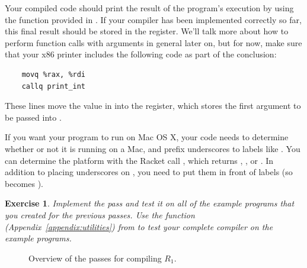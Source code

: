 \documentclass[11pt]{book}
\newtheorem{exercise}[theorem]{Exercise}
\begin{document}
Your compiled code should print the result of the program's execution
by using the  function provided in
. If your compiler has been implemented correctly so
far, this final result should be stored in the  register.
We'll talk more about how to perform function calls with arguments in
general later on, but for now, make sure that your x86 printer
includes the following code as part of the conclusion:

\begin{lstlisting}
    movq %rax, %rdi
    callq print_int
\end{lstlisting}

These lines move the value in  into the  register, which
stores the first argument to be passed into .

If you want your program to run on Mac OS X, your code needs to
determine whether or not it is running on a Mac, and prefix
underscores to labels like .  You can determine the platform
with the Racket call , which returns
, , or .  In addition to
placing underscores on , you need to put them in front of
 labels (so  becomes ).

\begin{exercise}
\normalfont Implement the  pass and test it on all of
the example programs that you created for the previous passes. Use the
 function (Appendix~\ref{appendix:utilities}) from
 to test your complete compiler on the example
programs.
\end{exercise}

\begin{figure}[p]

\caption{Overview of the passes for compiling $R_1$. }
\label{fig:R1-passes}
\end{figure}
\end{document}
